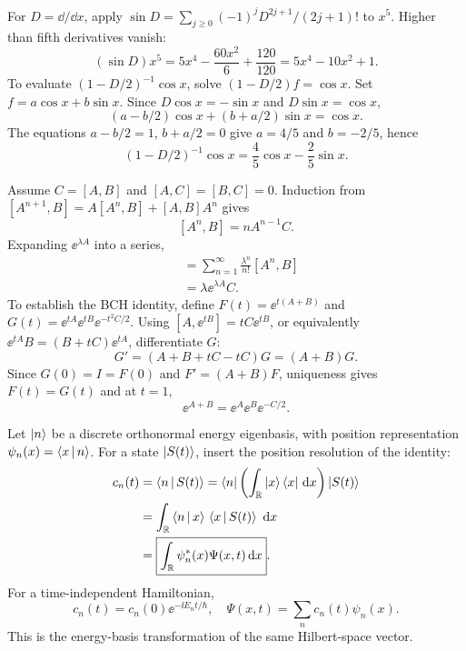For $D=\dd/\dd x$, apply
$\sin D=\sum_{j\ge0}(-1)^jD^{2j+1}/(2j+1)!$
to $x^5$. Higher than fifth derivatives vanish:
\begin{equation}
\boxed{(\sin D)x^5=
5x^4-\frac{60x^2}{6}+\frac{120}{120}
=5x^4-10x^2+1}.
\end{equation}
To evaluate $(1-D/2)^{-1}\cos x$, solve
$(1-D/2)f=\cos x$. Set
$f=a\cos x+b\sin x$.
Since $D\cos x=-\sin x$ and
$D\sin x=\cos x$,
\begin{equation}
(a-b/2)\cos x+(b+a/2)\sin x=\cos x.
\end{equation}
The equations $a-b/2=1$, $b+a/2=0$
give $a=4/5$ and $b=-2/5$, hence
\begin{equation}
\boxed{(1-D/2)^{-1}\cos x=
\frac45\cos x-\frac25\sin x}.
\end{equation}

Assume $C=[A,B]$ and $[A,C]=[B,C]=0$.
Induction from
$[A^{n+1},B]=A[A^n,B]+[A,B]A^n$
gives
\begin{equation}
\boxed{[A^n,B]=nA^{n-1}C}.
\end{equation}
Expanding $\ee^{\lambda A}$ into a series,
\begin{align}
[\ee^{\lambda A},B]
&=\sum_{n=1}^\infty\frac{\lambda^n}{n!}
[A^n,B]\\
&=\lambda\ee^{\lambda A}C.
\end{align}
To establish the BCH identity, define
$F(t)=\ee^{t(A+B)}$ and
$G(t)=\ee^{tA}\ee^{tB}\ee^{-t^2C/2}$.
Using $[A,\ee^{tB}]=tC\ee^{tB}$,
or equivalently
$\ee^{tA}B=(B+tC)\ee^{tA}$,
differentiate $G$:
\begin{equation}
G'=(A+B+tC-tC)G=(A+B)G.
\end{equation}
Since $G(0)=I=F(0)$ and
$F'=(A+B)F$, uniqueness gives
$F(t)=G(t)$ and at $t=1$,
\begin{equation}
\boxed{\ee^{A+B}=\ee^A\ee^B\ee^{-C/2}}.
\end{equation}

Let $\left|n\right\rangle$ be a discrete orthonormal
energy eigenbasis, with position representation
$\psi_n(x)=\left\langle x\,\middle|\,n\right\rangle$. For a state $\left|S(t)\right\rangle$,
insert the position resolution of the identity:
\begin{align}
c_n(t)&=\left\langle n\,\middle|\,S(t)\right\rangle
=\left\langle n\right|\left(\int_{\mathbb R}
\left|x\right\rangle\left\langle x\right|\,\mathrm{d} x\right)\left|S(t)\right\rangle\\
&=\int_{\mathbb R}
\left\langle n\,\middle|\,x\right\rangle\,\left\langle x\,\middle|\,S(t)\right\rangle\,\,\mathrm{d} x\\
&=\boxed{\int_{\mathbb R}
\psi_n^*(x)\Psi(x,t)\,\mathrm{d} x}.
\end{align}
For a time-independent Hamiltonian,
\begin{equation}
\boxed{c_n(t)=c_n(0)\ee^{-\ii E_nt/\hbar}},
\quad\boxed{\Psi(x,t)=\sum_nc_n(t)\psi_n(x)}.
\end{equation}
This is the energy-basis transformation
of the same Hilbert-space vector.
